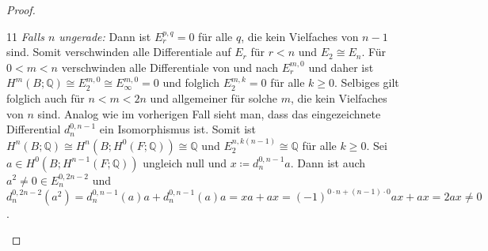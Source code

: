 \documentclass[11pt, a4paper, german]{article}
\theoremstyle{definition}
\theoremstyle{remark}
\newcommand{\Q}{\mathbb{Q}} %
\newcommand{\zeroDot}[2]{\node[draw,circle,inner sep=0.4pt,fill] at (#1,#2) {};} %
\begin{document}
\begin{proof}
  \renewcommand\windowpagestuff{
    \begin{center}\begin{tikzpicture}[x=16pt,y=16pt]\begin{scope}[shift={(0,0)}]
      \foreach \x in {1,2,3}{
        \foreach \y in {0,1,...,6}{
          \zeroDot{\x}{\y}
        }
      }
      \foreach \y in {0,...,6}{
        \zeroDot{5}{\y}
      }
      \foreach \x in {0,...,5}{
        \node at (\x,7.3) {\vdots};
      }
      \node at (0,0) {$\Q$\small $1$};
      \zeroDot{0}{1}
      \zeroDot{0}{2}
      \node at (0,3) {$\Q$\small $a$};
      \zeroDot{0}{4}
      \zeroDot{0}{5}
      \node at (0,6) {$\Q$\small $a^2$};
      \node at (4,0) {$\Q$\small $x$};
      \zeroDot{4}{1}
      \zeroDot{4}{2}
      \node at (4,3) {$\Q$\small $ax$};
      \zeroDot{4}{4}
      \zeroDot{4}{5}
      \node at (4,6) {$\Q$\small $a^2 x$};
      \draw[->,gray] (0.6,2.6) -- (3.4,0.4);
      \draw[->,gray] (0.6,5.6) -- (3.4,3.4);
      \draw[->] (-0.7,-0.6) -- (5.6,-0.6); %
      \draw[->] (-0.7,-0.6) -- (-0.7,7.8); %
      \node[left] at (-0.7,0) {$0$};
      \node[left] at (-0.9,1.7) {\vdots};
      \node[left] at (-0.7,3) {$n{-}1$};
      \node[left] at (-0.9,4.7) {\vdots};
      \node[left] at (-0.7,6) {$2n{-}2$};
      \node[below] at (0,-0.6) {$0$};
      \node[below] at (2,-0.7) {$\cdots$};
      \node[below] at (4,-0.7) {$n$};
    \end{scope}\end{tikzpicture}\end{center}
  }
  \opencutleft
  \begin{cutout}{0}{0pt}{\dimexpr\linewidth-5.5cm\relax}{11}
    \emph{Falls $n$ ungerade:} \enspace
    Dann ist $E_r^{p,q} = 0$ für alle $q$, die kein Vielfaches von $n-1$ sind.
    Somit verschwinden alle Differentiale auf $E_r$ für $r < n$ und $E_2 \cong E_n$.
    Für $0 < m < n$ verschwinden alle Differentiale von und nach $E_r^{m,0}$ und daher ist $H^m(B; \Q) \cong E_2^{m,0} \cong E_\infty^{m,0} = 0$ und  folglich $E_2^{m,k} = 0$ für alle $k \geq 0$.
    Selbiges gilt folglich auch für $n < m < 2n$ und allgemeiner für solche $m$, die kein Vielfaches von $n$ sind.
    Analog wie im vorherigen Fall sieht man, dass das eingezeichnete Differential $d_n^{0,n-1}$ ein Isomorphismus ist.
    Somit ist $H^n(B; \Q) \cong H^n(B; H^0(F; \Q)) \cong \Q$ und $E_2^{n,k(n-1)} \cong \Q$ für alle $k \geq 0$.
    Sei $a \in H^0(B; H^{n-1}(F; \Q))$ ungleich null und $x \coloneqq d_n^{0,n-1} a$.
    Dann ist auch $a^2 \neq 0 \in E_n^{0,2n-2}$ und $d_n^{0,2n-2}(a^2) = d_n^{0,n-1}(a)a + d_n^{0,n-1}(a)a = xa + ax = (-1)^{0 \cdot n + (n-1) \cdot 0} ax + ax = 2ax \neq 0$.

\end{cutout}
\end{proof}
\end{document}
